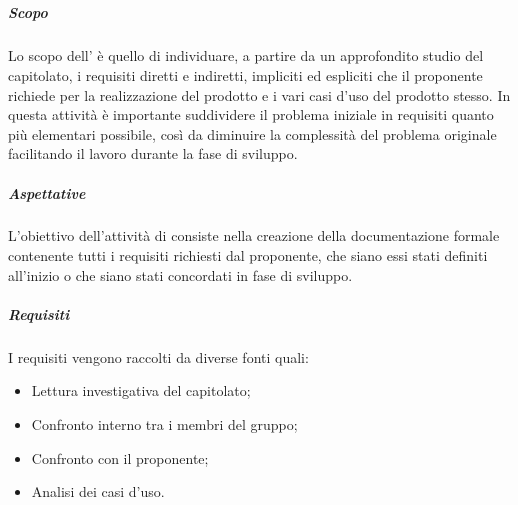 \subparagraph{\docNameAdR} \label{paragraph:Analisi dei requisiti}
\subparagraph*{Scopo}
Lo scopo dell'\docNameAdRLow{} è quello di individuare, a partire da un approfondito studio del capitolato, i requisiti diretti e indiretti,
impliciti ed espliciti che il proponente richiede per la realizzazione del prodotto e i vari casi d'uso del prodotto stesso. In questa attività è importante
suddividere il problema iniziale in requisiti quanto più elementari possibile, così da diminuire la complessità del problema originale
facilitando il lavoro durante la fase di sviluppo.

\subparagraph*{Aspettative} \label{subparagraph:ADR_Aspettative}
L'obiettivo dell'attività di \docNameAdRLow{} consiste nella creazione della documentazione formale contenente tutti i requisiti
richiesti dal proponente, che siano essi stati definiti all'inizio o che siano stati concordati in fase di sviluppo.

\subparagraph*{Requisiti} \label{subparagraph:Requisiti}
I requisiti vengono raccolti da diverse fonti quali:
\begin{itemize}
    \item Lettura investigativa del capitolato;
    \item Confronto interno tra i membri del gruppo;
    \item Confronto con il proponente;
    \item Analisi dei casi d'uso.
\end{itemize}

